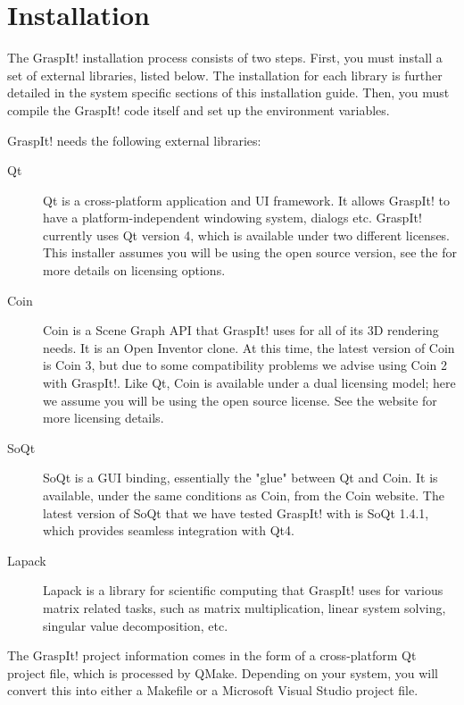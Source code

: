 \section{Installation}


The GraspIt! installation process consists of two steps. First, you
must install a set of external libraries, listed below. The
installation for each library is further detailed in the system
specific sections of this installation guide. Then, you must compile
the GraspIt! code itself and set up the environment variables.

GraspIt! needs the following external libraries:

\begin{description}
\item[Qt] Qt is a cross-platform application and UI framework. It
  allows GraspIt! to have a platform-independent windowing system,
  dialogs etc. GraspIt! currently uses Qt version 4, which is
  available under two different licenses. This installer assumes you
  will be using the open source version, see the  for more details on licensing
  options.

\item[Coin] Coin is a Scene Graph API that GraspIt! uses for all of
  its 3D rendering needs. It is an Open Inventor clone. At this time,
  the latest version of Coin is Coin 3, but due to some compatibility
  problems we advise using Coin 2 with GraspIt!. Like Qt, Coin is
  available under a dual licensing model; here we assume you will be
  using the open source license. See the
   website for more licensing
  details.

\item[SoQt] SoQt is a GUI binding, essentially the "glue" between Qt
  and Coin. It is available, under the same conditions as Coin, from
  the Coin website. The latest version of SoQt that we have tested
  GraspIt! with is SoQt 1.4.1, which provides seamless integration
  with Qt4.

\item[Lapack] Lapack is a library for scientific computing that
  GraspIt! uses for various matrix related tasks, such as matrix
  multiplication, linear system solving, singular value decomposition,
  etc.
\end{description}

The GraspIt! project information comes in the form of a cross-platform
Qt project file, which is processed by QMake. Depending on your
system, you will convert this into either a Makefile or a Microsoft
Visual Studio project file.
